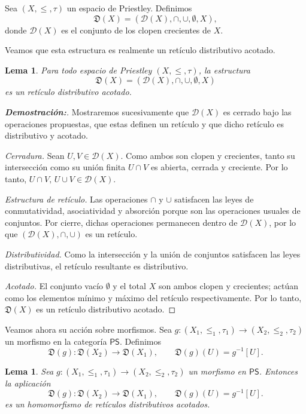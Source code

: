 \documentclass[12pt]{book}
\newtheorem{lemma}[theorem]{Lema}
\newcommand{\D}{\mathfrak{D}}
\begin{document}
Sea \( (X,\leq,\tau) \) un espacio de Priestley.
Definimos
\[
\D(X)=(\mathcal{D}(X),\cap,\cup,\emptyset,X),
\]
donde \( \mathcal{D}(X) \) es el conjunto de los clopen crecientes de \(X\).

Veamos que esta estructura es realmente un retículo 
distributivo acotado.

\begin{lemma}\label{lem:D-obj-reticulo}
Para todo espacio de Priestley \( (X,\leq,\tau) \),
la estructura 
\[
\D(X)=(\mathcal{D}(X),\cap,\cup,\emptyset,X)
\]
es un retículo distributivo acotado.
\end{lemma}

\begin{proof}[{\textbf{Demostración:}}]
Mostraremos sucesivamente que \(\mathcal{D}(X)\) es cerrado bajo las operaciones 
propuestas, que estas definen un retículo y que dicho retículo es distributivo y acotado.

\smallskip
\noindent\emph{Cerradura.}
Sean \(U,V\in \mathcal{D}(X)\). Como ambos son clopen y crecientes, tanto su intersección como su unión finita \(U\cap V\) es abierta, cerrada y creciente.
Por lo tanto, \(U\cap V,\,U\cup V\in \mathcal{D}(X)\).

\smallskip
\noindent\emph{Estructura de retículo.}
Las operaciones \(\cap\) y \(\cup\) satisfacen las leyes de conmutatividad, 
asociatividad y absorción porque son las operaciones usuales de conjuntos. 
Por cierre, dichas operaciones permanecen dentro de \(\mathcal{D}(X)\), por lo que 
\((\mathcal{D}(X),\cap,\cup)\) es un retículo.

\smallskip
\noindent\emph{Distributividad.}
Como la intersección y la unión de conjuntos satisfacen las leyes distributivas,
el retículo resultante es distributivo.

\smallskip
\noindent\emph{Acotado.}
El conjunto vacío \(\emptyset\) y el total \(X\) son ambos clopen y crecientes;
actúan como los elementos mínimo y máximo del retículo respectivamente. Por lo tanto, \(\D(X)\) es un 
retículo distributivo acotado.
\end{proof}

Veamos ahora su acción sobre morfismos. Sea $g\colon (X_{1},\leq_{1},\tau_{1})\to(X_{2},\leq_{2},\tau_{2})$ un morfismo en la categoría \( \mathsf{PS} \). Definimos
\[
\D(g)\colon \D(X_{2})\to\D(X_{1}),
\qquad
\D(g)(U)=g^{-1}[U].
\]


\begin{lemma}\label{lem:D-morfismo-bdl}
Sea 
\( g\colon (X_{1},\leq_{1},\tau_{1})\to(X_{2},\leq_{2},\tau_{2}) \)
un morfismo en \( \mathsf{PS} \).
Entonces la aplicación
\[
\D(g)\colon \D(X_{2})\to\D(X_{1}),
\qquad
\D(g)(U)=g^{-1}[U].
\]
es un homomorfismo de retículos distributivos acotados.
\end{lemma}
\end{document}
